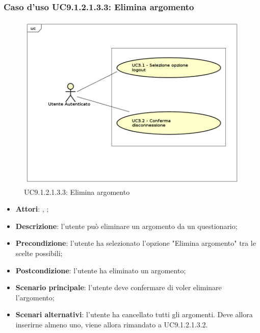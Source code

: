 						\subsubsection{Caso d'uso UC9.1.2.1.3.3: Elimina argomento}
						\label{UC9.1.2.1.3.3}
						\begin{figure}[h]
							\centering
							\includegraphics[scale=0.5,keepaspectratio]{UML/UC9.png}
							\caption{UC9.1.2.1.3.3: Elimina argomento}
						\end{figure}
						\FloatBarrier
						\begin{itemize}
							\item \textbf{Attori}: \uau, \uaupro;
							\item \textbf{Descrizione}: l'utente può eliminare un argomento da un questionario;
							\item \textbf{Precondizione}: l'utente ha selezionato l'opzione "Elimina argomento" tra le scelte possibili;
							\item \textbf{Postcondizione}: l'utente ha eliminato un argomento;
							\item \textbf{Scenario principale}: l'utente deve confermare di voler eliminare l'argomento; 
							\item \textbf{Scenari alternativi}: l'utente ha cancellato tutti gli argomenti. Deve allora inserirne almeno uno, viene allora rimandato a UC9.1.2.1.3.2.
						\end{itemize}
						

